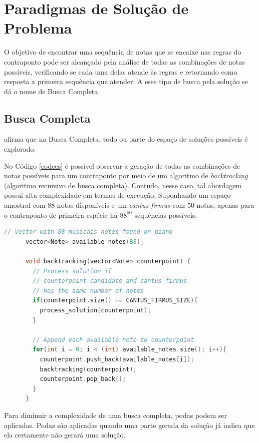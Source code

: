   \section[Paradigmas de Solução de Problema]{Paradigmas de Solução de Problema}

    O objetivo de encontrar uma sequência de notas que se encaixe nas regras do contraponto pode ser alcançado pela análise de todas as combinações de notas possíveis, verificando se cada uma delas atende às regras e retornando como resposta a primeira sequência que atender. A esse tipo de busca pela solução se dá o nome de Busca Completa.

    \subsection[Busca Completa]{Busca Completa}

       afirma que na Busca Completa, todo ou parte do espaço de soluções possíveis é explorado.

      No Código \ref{codecs} é possível observar a geração de todas as combinações de notas possíveis para um contraponto por meio de um algoritmo de \textit{backtracking} (algoritmo recursivo de busca completa). Contudo, nesse caso, tal abordagem possui alta complexidade em termos de execução. Suponhando um espaço amostral com 88 notas disponíveis e um \textit{cantus firmus} com 50 notas, apenas para o contraponto de primeira espécie há $88^{50}$ sequências possíveis.

      \begin{lstlisting}[language={C}, caption={Busca Completa}, label={codecs}]
      // Vector with 88 musicais notes found on piano
      vector<Note> available_notes(88);

      void backtracking(vector<Note> counterpoint) {
        // Process solution if
        // counterpoint candidate and cantus firmus
        // has the same number of notes
        if(counterpoint.size() == CANTUS_FIRMUS_SIZE){
          process_solution(counterpoint);
        }

        // Append each available note to counterpoint
        for(int i = 0; i < (int) available_notes.size(); i++){
          counterpoint.push_back(available_notes[i]);
          backtracking(counterpoint);
          counterpoint.pop_back();
        }
      }
      \end{lstlisting}

      Para diminuir a complexidade de uma busca completa, podas podem ser aplicadas. Podas são aplicadas quando uma parte gerada da solução já indica que ela certamente não gerará uma solução.

